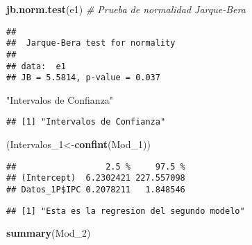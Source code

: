 \documentclass[
]{article}
\newenvironment{Shaded}{\begin{snugshade}}{\end{snugshade}}
\newcommand{\CommentTok}[1]{\textcolor[rgb]{0.56,0.35,0.01}{\textit{#1}}}
\newcommand{\DecValTok}[1]{\textcolor[rgb]{0.00,0.00,0.81}{#1}}
\newcommand{\KeywordTok}[1]{\textcolor[rgb]{0.13,0.29,0.53}{\textbf{#1}}}
\newcommand{\NormalTok}[1]{#1}
\newcommand{\OperatorTok}[1]{\textcolor[rgb]{0.81,0.36,0.00}{\textbf{#1}}}
\newcommand{\StringTok}[1]{\textcolor[rgb]{0.31,0.60,0.02}{#1}}
\begin{document}
\begin{Shaded}
\begin{Highlighting}[]
\KeywordTok{jb.norm.test}\NormalTok{(e1) }\CommentTok{# Prueba de normalidad Jarque-Bera }
\end{Highlighting}
\end{Shaded}

\begin{verbatim}
## 
##  Jarque-Bera test for normality
## 
## data:  e1
## JB = 5.5814, p-value = 0.037
\end{verbatim}

\begin{Shaded}
\begin{Highlighting}[]
\StringTok{"Intervalos de Confianza"}
\end{Highlighting}
\end{Shaded}

\begin{verbatim}
## [1] "Intervalos de Confianza"
\end{verbatim}

\begin{Shaded}
\begin{Highlighting}[]
\NormalTok{(Intervalos_}\DecValTok{1}\NormalTok{<-}\KeywordTok{confint}\NormalTok{(Mod_}\DecValTok{1}\NormalTok{))}
\end{Highlighting}
\end{Shaded}

\begin{verbatim}
##                  2.5 %     97.5 %
## (Intercept)  6.2302421 227.557098
## Datos_1P$IPC 0.2078211   1.848546
\end{verbatim}

\begin{Shaded}
\end{Shaded}

\begin{verbatim}
## [1] "Esta es la regresion del segundo modelo"
\end{verbatim}

\begin{Shaded}
\begin{Highlighting}[]
\KeywordTok{summary}\NormalTok{(Mod_}\DecValTok{2}\NormalTok{) }
\end{Highlighting}
\end{Shaded}
\end{document}
